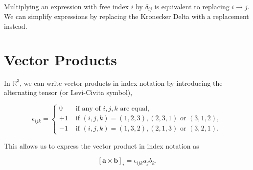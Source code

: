 \begin{proposition}
  Multiplying an expression with free index \(i\) by \(\delta_{i j}\) is equivalent to replacing \(i \rightarrow j\). We can simplify expressions by replacing the Kronecker Delta with a replacement instead.
\end{proposition}

\begin{proofidea}
  
  
\end{proofidea}
  
\begin{formalproof}
  
\end{formalproof}

\section{Vector Products} 

\begin{definition}
  In \(\mathbb{R}^3\), we can write vector products in index notation by introducing the alternating tensor (or Levi-Civita symbol),

\[
\epsilon_{i j k}= \begin{cases}0 & \text { if any of } i, j, k \text { are equal, } \\ +1 & \text { if }(i, j, k)=(1,2,3),(2,3,1) \text { or }(3,1,2), \\ -1 & \text { if }(i, j, k)=(1,3,2),(2,1,3) \text { or }(3,2,1) .\end{cases}
\]
\end{definition}

\begin{remark}
  
This allows us to express the vector product in index notation as

\[
[\boldsymbol{a} \times \boldsymbol{b}]_i=\epsilon_{i j k} a_j b_k .
\]

\end{remark}

